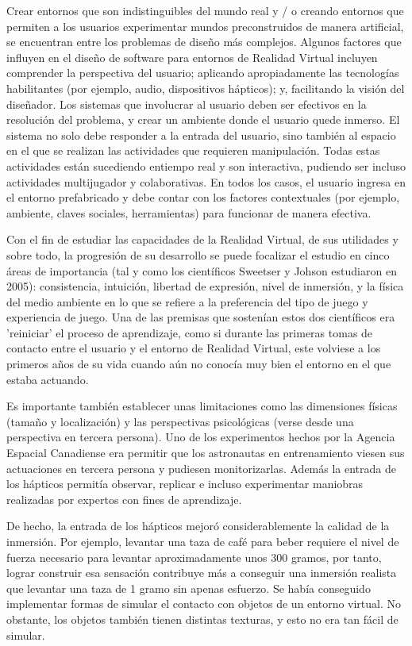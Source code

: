 \documentclass[twoside,twocolumn]{article}
\begin{document}
Crear entornos que son indistinguibles del mundo real y / o creando entornos que permiten a los usuarios experimentar mundos preconstruidos de manera artificial, se encuentran entre los problemas de diseño más complejos.
Algunos factores que influyen en el diseño de software para entornos de Realidad Virtual incluyen comprender la perspectiva del usuario; aplicando apropiadamente las tecnologías habilitantes (por ejemplo, audio, dispositivos hápticos); y, facilitando la visión del diseñador. Los sistemas que involucrar al usuario  deben ser efectivos en la resolución del problema, y crear un ambiente donde el usuario quede inmerso. El sistema no solo debe responder a la entrada del usuario, sino también al espacio en el que se realizan las actividades que requieren manipulación. Todas estas actividades están sucediendo entiempo real y son interactiva, pudiendo ser incluso actividades multijugador y colaborativas. En todos los casos, el usuario ingresa en el entorno prefabricado y debe contar con los factores contextuales (por ejemplo, ambiente, claves sociales, herramientas) para funcionar de manera efectiva.

Con el fin de estudiar las capacidades de la Realidad Virtual, de sus utilidades y sobre todo, la progresión de su desarrollo se puede focalizar el estudio en cinco áreas de importancia (tal y como los científicos Sweetser y Johson estudiaron en 2005): consistencia, intuición, libertad de expresión, nivel de inmersión, y la física del medio ambiente en lo que se refiere a la preferencia del tipo de juego y experiencia de juego. Una de las premisas que sostenían estos dos científicos era 'reiniciar' el proceso de aprendizaje, como si durante las primeras tomas de contacto entre el usuario y el entorno de Realidad Virtual, este volviese a los primeros años de su vida cuando aún no conocía muy bien el entorno en el que estaba actuando.

Es importante también establecer unas limitaciones como las dimensiones físicas (tamaño y localización) y las perspectivas psicológicas (verse desde una perspectiva en tercera persona).  Uno de los experimentos hechos por la Agencia Espacial Canadiense era permitir que los astronautas en entrenamiento viesen sus actuaciones en tercera persona y pudiesen monitorizarlas. Además la entrada de los hápticos permitía observar, replicar e incluso experimentar maniobras realizadas por expertos con fines de aprendizaje.

De hecho, la entrada de los hápticos mejoró considerablemente la calidad de la inmersión. Por ejemplo, levantar una taza de café para beber requiere el nivel de fuerza necesario para levantar aproximadamente unos 300 gramos, por tanto, lograr construir esa sensación contribuye más a conseguir una inmersión realista que levantar una taza de 1 gramo sin apenas esfuerzo. Se había conseguido implementar formas de simular el contacto con objetos de un entorno virtual. No obstante, los objetos también tienen distintas texturas, y esto no era tan fácil de simular.
\end{document}
